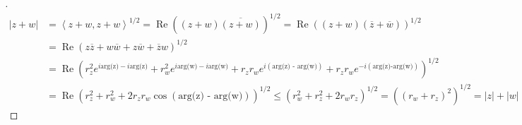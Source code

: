 \documentclass{article}
\begin{document}
\begin{proof}[\unskip\nopunct]
  \begin{align*}|z + w| &= \left<z + w, z+ w\right>^{1/2} = \operatorname{Re}((z+w)\overline{(z+w)})^{1/2} = \operatorname{Re}((z+w)(\overline{z}+\overline{w}))^{1/2} \\
    &= \operatorname{Re}(z\overline{z} + w\overline{w} + z\overline{w} + \overline{z}w)^{1/2} \\
    &= \operatorname{Re}(r_z^2e^{i\text{arg(z)} - i\text{arg(z)}} + r_w^2 e^{i\text{arg(w)} -i\text{arg(w)}} + r_zr_we^{i(\text{arg(z) - arg(w)})} + r_zr_we^{-i(\text{arg(z)-arg(w)} )})^{1/2} \\
    &=\operatorname{Re}(r^2_z + r^2_w + 2r_zr_w\cos(\text{arg(z) - arg(w)}))^{1/2} \leq (r^2_w + r^2_z + 2r_wr_z)^{1/2} = ((r_w + r_z)^2)^{1/2} = |z| + |w|
  \end{align*}
\end{proof}
\end{document}
